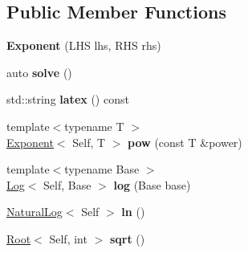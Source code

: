 \subsection*{\-Public \-Member \-Functions}
\begin{DoxyCompactItemize}
\item 
\hypertarget{classlatex_1_1math_1_1Exponent_aa5aed1982f782807e28d89ee55e80b6c}{{\bfseries \-Exponent} (\-L\-H\-S lhs, \-R\-H\-S rhs)}\label{classlatex_1_1math_1_1Exponent_aa5aed1982f782807e28d89ee55e80b6c}

\item 
\hypertarget{classlatex_1_1math_1_1Exponent_a8439ad349c0eccc952ef103f08d2bfa9}{auto {\bfseries solve} ()}\label{classlatex_1_1math_1_1Exponent_a8439ad349c0eccc952ef103f08d2bfa9}

\item 
\hypertarget{classlatex_1_1math_1_1Exponent_a8574c4b6b5e978c26b3aec20a8ecddaa}{std\-::string {\bfseries latex} () const }\label{classlatex_1_1math_1_1Exponent_a8574c4b6b5e978c26b3aec20a8ecddaa}

\item 
\hypertarget{classlatex_1_1math_1_1Exponent_a3356a953247f72211236fc7348a96eee}{{\footnotesize template$<$typename T $>$ }\\\hyperlink{classlatex_1_1math_1_1Exponent}{\-Exponent}$<$ \-Self, \-T $>$ {\bfseries pow} (const \-T \&power)}\label{classlatex_1_1math_1_1Exponent_a3356a953247f72211236fc7348a96eee}

\item 
\hypertarget{classlatex_1_1math_1_1Exponent_a9ab50d8d1eec6941094ad43be822ebc9}{{\footnotesize template$<$typename Base $>$ }\\\hyperlink{classlatex_1_1math_1_1Log}{\-Log}$<$ \-Self, \-Base $>$ {\bfseries log} (\-Base base)}\label{classlatex_1_1math_1_1Exponent_a9ab50d8d1eec6941094ad43be822ebc9}

\item 
\hypertarget{classlatex_1_1math_1_1Exponent_afcc8f289108fa9e56aeb149698f3eeb3}{\hyperlink{classlatex_1_1math_1_1NaturalLog}{\-Natural\-Log}$<$ \-Self $>$ {\bfseries ln} ()}\label{classlatex_1_1math_1_1Exponent_afcc8f289108fa9e56aeb149698f3eeb3}

\item 
\hypertarget{classlatex_1_1math_1_1Exponent_acd5ba5b5920f79e1b1a7332c3f248121}{\hyperlink{classlatex_1_1math_1_1Root}{\-Root}$<$ \-Self, int $>$ {\bfseries sqrt} ()}\label{classlatex_1_1math_1_1Exponent_acd5ba5b5920f79e1b1a7332c3f248121}

\end{DoxyCompactItemize}
